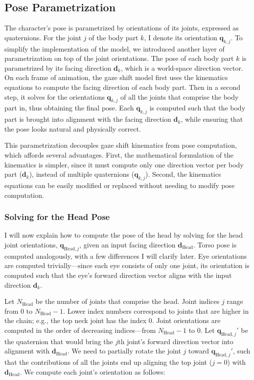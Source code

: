\subsection{Pose Parametrization}
\label{sec:GazeShiftPose}

The character's pose is parametrized by orientations of its joints, expressed as quaternions. For the joint $j$ of the body part $k$, I denote its orientation $\mathbf{q}_{k,j}$. To simplify the implementation of the model, we introduced another layer of parametrization on top of the joint orientations. The pose of each body part $k$ is parametrized by its facing direction $\mathbf{d}_k$, which is a world-space direction vector. On each frame of animation, the gaze shift model first uses the kinematics equations to compute the facing direction of each body part. Then in a second step, it solves for the orientations $\mathbf{q}_{k,j}$ of all the joints that comprise the body part in, thus obtaining the final pose. Each $\mathbf{q}_{k,j}$ is computed such that the body part is brought into alignment with the facing direction $\mathbf{d}_k$, while ensuring that the pose looks natural and physically correct.

This parametrization decouples gaze shift kinematics from pose computation, which affords several advantages. First, the mathematical formulation of the kinematics is simpler, since it must compute only one direction vector per body part ($\mathbf{d}_k$), instead of multiple quaternions ($\mathbf{q}_{k,j}$). Second, the kinematics equations can be easily modified or replaced without needing to modify pose computation.

\subsubsection{Solving for the Head Pose}

I will now explain how to compute the pose of the head by solving for the head joint orientations, $\mathbf{q}_{\mathrm{Head},j}$, given an input facing direction $\mathbf{d}_{\mathrm{Head}}$. Torso pose is computed analogously, with a few differences I will clarify later. Eye orientations are computed trivially---since each eye consists of only one joint, its orientation is computed such that the eye's forward direction vector aligns with the input direction $\mathbf{d}_k$.

Let $N_{\mathrm{Head}}$ be the number of joints that comprise the head. Joint indices $j$ range from 0 to $N_{\mathrm{Head}} - 1$. Lower index numbers correspond to joints that are higher in the chain; e.g., the top neck joint has the index 0. Joint orientations are computed in the order of decreasing indices---from $N_{\mathrm{Head}} - 1$ to 0. Let $\mathbf{q}_{\mathrm{Head},j}'$ be the quaternion that would bring the $j$th joint's forward direction vector into alignment with $\mathbf{d}_{\mathrm{Head}}$. We need to partially rotate the joint $j$ toward $\mathbf{q}_{\mathrm{Head},j}'$, such that the contributions of all the joints end up aligning the top joint ($j = 0$) with $\mathbf{d}_{\mathrm{Head}}$. We compute each joint's orientation as follows:

